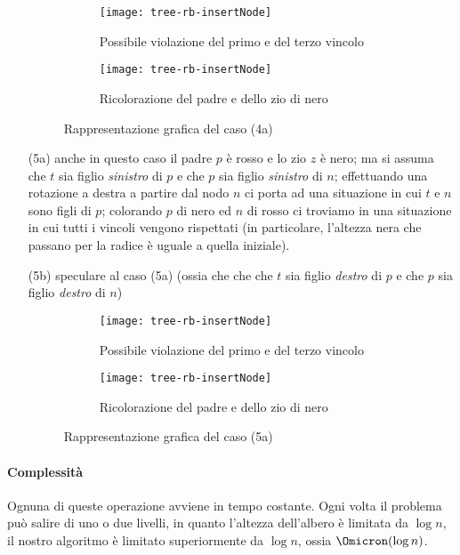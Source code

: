 \begin{enumerate}[label={\footnotesize\ttfamily (\arabic*)}, start=0]
	\begin{figure}[H]\centering
		\begin{subfigure}[t]{.5\textwidth}
			\texttt{[image: tree-rb-insertNode]}
			\caption{Possibile violazione del primo e del terzo vincolo}
		\end{subfigure}%
		\begin{subfigure}[t]{.5\textwidth}
			\texttt{[image: tree-rb-insertNode]}
			\caption{Ricolorazione del padre e dello zio di nero}
		\end{subfigure}
		\caption[]{Rappresentazione grafica del caso {\footnotesize\ttfamily (4a)}}
	\end{figure}

	\item[\footnotesize\ttfamily (5a)] anche in questo caso il padre \(p\) è rosso e lo zio \(z\) è nero; ma si assuma che \(t\) sia figlio \emph{sinistro} di \(p\) e che \(p\) sia figlio \emph{sinistro}  di \(n\); effettuando una rotazione a destra a partire dal nodo \(n\) ci porta ad una situazione in cui \(t\) e \(n\) sono figli di \(p\); colorando \(p\) di nero ed \(n\) di rosso ci troviamo in una situazione in cui tutti i vincoli vengono rispettati (in particolare, l'altezza nera che passano per la radice è uguale a quella iniziale).

	\item[\footnotesize\ttfamily (5b)] speculare al caso {\footnotesize\ttfamily (5a)} (ossia che che che \(t\) sia figlio \emph{destro} di \(p\) e che \(p\) sia figlio \emph{destro}  di \(n\))

	\begin{figure}[H]\centering
		\begin{subfigure}[t]{.5\textwidth}
			\texttt{[image: tree-rb-insertNode]}
			\caption{Possibile violazione del primo e del terzo vincolo}
		\end{subfigure}%
		\begin{subfigure}[t]{.5\textwidth}
			\texttt{[image: tree-rb-insertNode]}
			\caption{Ricolorazione del padre e dello zio di nero}
		\end{subfigure}
		\caption[]{Rappresentazione grafica del caso {\footnotesize\ttfamily (5a)}}
	\end{figure}
\end{enumerate}

\paragraph{Complessità}
Ognuna di queste operazione avviene in tempo costante.
Ogni volta il problema può salire di uno o due livelli, in quanto l'altezza dell'albero è limitata da \(\log n\), il nostro algoritmo è limitato superiormente da \(\log n\), ossia \(\Omicron(\log n)\).

